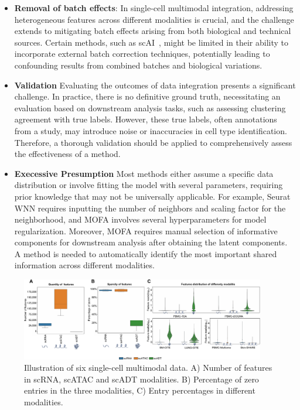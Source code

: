 \begin{itemize}
	\item \textbf{Removal of batch effects}:
	In single-cell multimodal integration, addressing heterogeneous features across different modalities is crucial, and the challenge extends to mitigating batch effects arising from both biological and technical sources. Certain methods, such as scAI~\citep{jin2020scai}, might be limited in their ability to incorporate external batch correction techniques, potentially leading to confounding results from combined batches and biological variations.

	\item \textbf{Validation}
	Evaluating the outcomes of data integration presents a significant challenge. In practice, there is no definitive ground truth, necessitating an evaluation based on downstream analysis tasks, such as assessing clustering agreement with true labels. However, these true labels, often annotations from a study, may introduce noise or inaccuracies in cell type identification. Therefore, a thorough validation should be applied to comprehensively assess the effectiveness of a method.

  \item \textbf{Execessive Presumption}
  Most methods either assume a specific data distribution or involve fitting the model with several parameters, requiring prior knowledge that may not be universally applicable. For example, Seurat WNN requires inputting the number of neighbors and scaling factor for the neighborhood, and MOFA involves several hyperparameters for model regularization. Moreover, MOFA requires manual selection of informative components for downstream analysis after obtaining the latent components. A method is needed to automatically identify the most important shared information across different modalities.

\end{itemize}

\begin{figure}[!ht]
	\centering
	\includegraphics[width=0.95\textwidth]{feature_statistic/fig}
	\vspace{0.1cm}
	\caption[features characteristics comparison showing the challenge of multimodal integration.]{Illustration of six single-cell multimodal data. A) Number of features in scRNA, scATAC and scADT modalities. B) Percentage of zero entries in the three modalities, C) Entry percentages in different modalities.}
	\label{fig:modalities_differences}
\end{figure}

